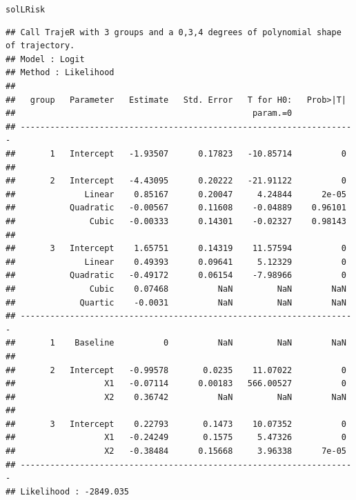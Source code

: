 \documentclass{article}\usepackage[]{graphicx}\usepackage[]{color}
\makeatletter
\newcommand{\hlstd}[1]{\textcolor[rgb]{0.345,0.345,0.345}{#1}}%
\newenvironment{kframe}{%
 \def\at@end@of@kframe{}%
 \ifinner\ifhmode%
  \def\at@end@of@kframe{\end{minipage}}%
  \begin{minipage}{\columnwidth}%
 \fi\fi%
 \def\FrameCommand##1{\hskip\@totalleftmargin \hskip-\fboxsep
 \colorbox{shadecolor}{##1}\hskip-\fboxsep
     \hskip-\linewidth \hskip-\@totalleftmargin \hskip\columnwidth}%
 \MakeFramed {\advance\hsize-\width
   \@totalleftmargin\z@ \linewidth\hsize
   \@setminipage}}%
 {\par\unskip\endMakeFramed%
 \at@end@of@kframe}
\newenvironment{knitrout}{}{} %
\makeatother
\begin{document}
\begin{knitrout}
\color{fgcolor}\begin{kframe}
\begin{alltt}
\hlstd{solLRisk}
\end{alltt}
\begin{verbatim}
## Call TrajeR with 3 groups and a 0,3,4 degrees of polynomial shape of trajectory.
## Model : Logit
## Method : Likelihood 
##  
##   group   Parameter   Estimate   Std. Error   T for H0:   Prob>|T|  
##                                                param.=0             
## --------------------------------------------------------------------
##       1   Intercept   -1.93507      0.17823   -10.85714          0  
##                                                                     
##       2   Intercept   -4.43095      0.20222   -21.91122          0  
##              Linear    0.85167      0.20047     4.24844      2e-05  
##           Quadratic   -0.00567      0.11608    -0.04889    0.96101  
##               Cubic   -0.00333      0.14301    -0.02327    0.98143  
##                                                                     
##       3   Intercept    1.65751      0.14319    11.57594          0  
##              Linear    0.49393      0.09641     5.12329          0  
##           Quadratic   -0.49172      0.06154    -7.98966          0  
##               Cubic    0.07468          NaN         NaN        NaN  
##             Quartic    -0.0031          NaN         NaN        NaN  
## --------------------------------------------------------------------
##       1    Baseline          0          NaN         NaN        NaN  
##                                                                     
##       2   Intercept   -0.99578       0.0235    11.07022          0  
##                  X1   -0.07114      0.00183   566.00527          0  
##                  X2    0.36742          NaN         NaN        NaN  
##                                                                     
##       3   Intercept    0.22793       0.1473    10.07352          0  
##                  X1   -0.24249       0.1575     5.47326          0  
##                  X2   -0.38484      0.15668     3.96338      7e-05  
## --------------------------------------------------------------------
## Likelihood : -2849.035
\end{verbatim}
\end{kframe}
\end{knitrout}
\end{document}
